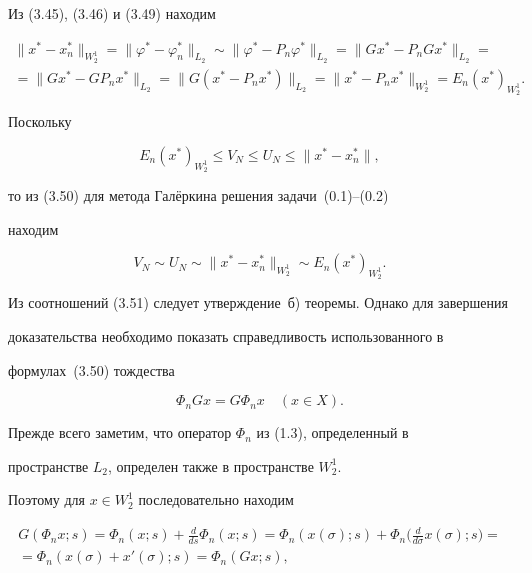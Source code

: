 Из (3.45), (3.46) и (3.49) находим


\begin{multline}


\|x^*-x_n^*\|_{{W_2^1}} =\|\varphi^*-\varphi_n^*\|_{{L_2}}


\sim \|\varphi^* - P_n\varphi^*\|_{{L_2}} =


\|Gx^*-P_nGx^*\|_{{L_2}} = \\


%


=\|Gx^*-GP_nx^*\|_{{L_2}} =\|G(x^*-P_nx^*)\|_{{L_2}} =


\|x^*-P_nx^*\|_{{W_2^1}} =E_n(x^*)_{{W_2^1}}.


\end{multline}


Поскольку


$$


E_n(x^*)_{{W_2^1}} \leq V_N\leq U_N\leq \|x^*-x_n^*\|,


$$


то из (3.50) для метода Гал\"еркина решения задачи~(0.1)--(0.2)


находим


\begin{equation}


V_N\sim U_N\sim \|x^*-x_n^*\|_{{W_2^1}} \sim E_n(x^*)_{{W_2^1}}.


\end{equation}


Из соотношений (3.51) следует утверждение~б) теоремы. Однако для завершения


доказательства необходимо показать справедливость использованного в


формулах~(3.50) тождества


\begin{equation}


\Phi_nGx=G\Phi_nx\quad (x\in X).


\end{equation}





Прежде всего заметим, что оператор $\Phi_n$ из (1.3), определенный в


пространстве $L_2$, определен также в пространстве $W_2^1$. 


Поэтому для $x\in W_2^1$ последовательно находим


\begin{multline*}


G(\Phi_nx;s)=\Phi_n(x;s)+\frac{d}{ds}\Phi_n(x;s)=


\Phi_n(x(\sigma );s)+\Phi_n\bigg(\frac{d}{d\sigma}x(\sigma );s\bigg)=\\


%


=\Phi_n(x(\sigma )+x'(\sigma );s)=\Phi_n(Gx;s),


\end{multline*}


